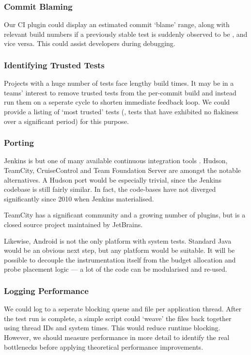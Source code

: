 \subsubsection{Commit Blaming}

Our CI plugin could display an estimated commit {\lq}blame{\rq} range, along
with relevant build numbers if a previously stable test is suddenly observed to
be \flaky, and vice versa. This could assist developers during debugging.

\subsubsection{Identifying Trusted Tests}

Projects with a huge number of tests face lengthy build times. It may be in a
teams' interest to remove trusted tests from the per-commit build and instead
run them on a seperate cycle to shorten immediate feedback loop. We could
provide a listing of {\lq}most trusted{\rq} tests (\ie, tests that have
exhibited no flakiness over a significant period) for this purpose.

\subsubsection{Porting}

Jenkins is but one of many available continuous integration tools
\cite{ContinuousIntegrationSoftware}. Hudson, TeamCity, CruiseControl and Team
Foundation Server are amongst the notable alternatives. A Hudson port would be
especially trivial, since the Jenkins codebase is still fairly similar. In fact,
the code-bases have not diverged significantly since 2010 when Jenkins
materialised.

TeamCity \cite{TeamCity} has a significant community and a growing number of
plugins, but is a closed source project maintained by JetBrains.

Likewise, Android is not the only platform with system tests. Standard Java
would be an obvious next step, but any platform would be suitable. It will be
possible to decouple the instrumentation itself from the budget allocation and
probe placement logic --- a lot of the code can be modularised and re-used.

\subsubsection{Logging Performance}

We could log to a seperate blocking queue and file per application thread. After
the test run is complete, a simple script could {\lq}weave{\rq} the files back
together using thread IDs and system times. This would reduce runtime blocking.
However, we should measure performance in more detail to identify the real
bottlenecks before applying theoretical performance improvements.
